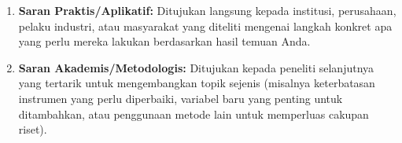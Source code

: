 \begin{enumerate}
	\item \textbf{Saran Praktis/Aplikatif:} Ditujukan langsung kepada institusi, perusahaan, pelaku industri, atau masyarakat yang diteliti mengenai langkah konkret apa yang perlu mereka lakukan berdasarkan hasil temuan Anda.
	
	\item \textbf{Saran Akademis/Metodologis:} Ditujukan kepada peneliti selanjutnya yang tertarik untuk mengembangkan topik sejenis (misalnya keterbatasan instrumen yang perlu diperbaiki, variabel baru yang penting untuk ditambahkan, atau penggunaan metode lain untuk memperluas cakupan riset).
\end{enumerate}